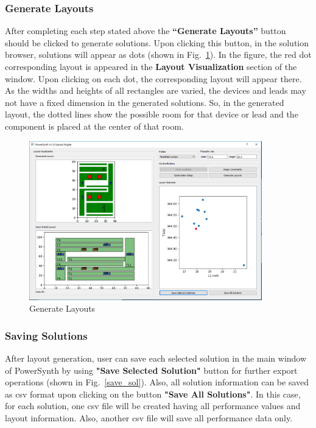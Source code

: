 \documentclass[11pt]{article}
\begin{document}
\subsubsection{Generate Layouts}
\label{sec-2-6-5}
After completing each step stated above the \textbf{“Generate Layouts”} button should be clicked to generate solutions. Upon clicking this button, in the solution browser, solutions will appear as dots (shown in Fig.~\ref{gen_layout}). In the figure, the red dot corresponding layout is appeared in the \textbf{Layout Visualization} section of the window. Upon clicking on each dot, the corresponding layout will appear there. As the widths and heights of all rectangles are varied, the devices and leads may not have a fixed dimension in the generated solutions. So, in the generated layout, the dotted lines show the possible room for that device or lead and the component is placed at the center of that room.
\begin{figure}[t]
\centering
\includegraphics[width=0.9\textwidth,height=3.8 in]{./figs/gen_layout_env.PNG}
\caption{Generate Layouts}
\label{gen_layout}
\end{figure}
\subsubsection{Saving Solutions}
\label{sec-2-6-6}
 After layout generation, user can save each selected solution in the main window of PowerSynth by using \textbf{"Save Selected Solution"} button for further export operations (shown in Fig.~\ref{save_sol}). Also, all solution information can be saved as csv format upon clicking on the button \textbf{"Save All Solutions"}. In this case, for each solution, one csv file will be created having all performance values and layout information. Also, another csv file will save all performance data only.
\end{document}
